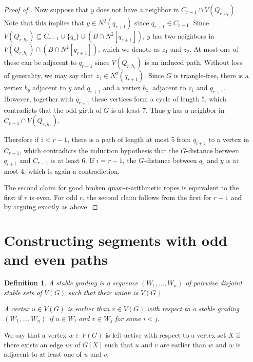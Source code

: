 \documentclass{article}
\newtheorem{definition}[theorem]{Definition}
\begin{document}
\begin{proof}[Proof of ]
    Now suppose that $y$ does not have a neighbor in $C_{r - 1} \cap V(Q_{r,    h_r})$. Note that this implies that $y \in N^2(q_{r+1})$ since $q_{r + 1} \in C_{r - 1}$. Since $V(Q_{r, h_r}) \subseteq C_{r - 1} \cup \{q_r\} \cup (B \cap N^2[q_{r + 1}])$, $y$ has two neighbors in $V(Q_{r, h_r}) \cap (B \cap N^2[q_{r + 1}])$, which we denote as $z_1$ and $z_2$. At most one of these can be adjacent to $q_{r +1 }$ since $V(Q_{r, h_r})$ is an induced path. Without loss of generality, we may say that $z_1 \in N^2(q_{r + 1})$. Since $G$ is triangle-free, there is a vertex $b_{y}$ adjacent to $y$ and $q_{r + 1}$ and a vertex $b_{z_1}$ adjacent to $z_1$ and $q_{r + 1}$. However, together with $q_{r + 1}$ these vertices form a cycle of length 5, which contradicts that the odd girth of $G$ is at least $7$. Thus $y$ has a neighbor in $C_{r - 1} \cap V(Q_{r, h_r})$.
    
    Therefore if $i < r - 1$, there is a path of length at most 5 from $q_{i + 1}$ to a vertex in $C_{r - 1}$, which contradicts the induction hypothesis that the $G$-distance between $q_{i + 1}$ and $C_{r - 1}$ is at least 6. If $i = r - 1$, the $G$-distance between $q_r$ and $y$ is at most 4, which is again a contradiction.

    The second claim for good broken quasi-$r$-arithmetic ropes is equivalent to the first if $r$ is even. For odd $r$, the second claim follows from the first for $r-1$ and  by arguing exactly as above. 
\end{proof}

\section{Constructing segments with odd and even paths}
\label{sec:segments_odd_and_even}

\begin{definition}
    A stable grading is a sequence $(W_1, \dots, W_n)$ of pairwise disjoint stable sets of $V(G)$ such that their union is $V(G)$.
    
    A vertex $u \in V(G)$ is earlier than $v \in V(G)$ with respect to a stable grading $(W_1, \dots, W_n)$ if $u \in W_i$ and $v \in W_j$ for some $i < j$.
\end{definition}

We say that a vertex $w \in V(G)$ is left-active with respect to a vertex set $X$ if there exists an edge $uv$ of $G[X]$ such that $u$ and $v$ are earlier than $w$ and $w$ is adjacent to at least one of $u$ and $v$.
\end{document}
